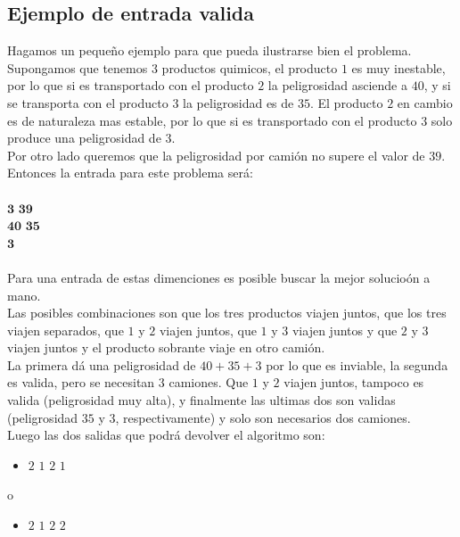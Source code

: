 \subsection{Ejemplo de entrada valida}
Hagamos un pequeño ejemplo para que pueda ilustrarse bien el problema.
\\
Supongamos que tenemos $3$ productos quimicos, el producto $1$ es muy inestable, por lo que si es transportado con el producto $2$ la peligrosidad asciende a $40$, y si se transporta con el producto $3$ la peligrosidad es de $35$. El producto $2$ en cambio es de naturaleza mas estable, por lo que si es transportado con el producto $3$ solo produce una peligrosidad de $3$.
\\
Por otro lado queremos que la peligrosidad por cami\'on no supere el valor de $39$.
\\
Entonces la entrada para este problema ser\'a:
\\
\\
$\textbf{3 39}$
\\
$\textbf{40 35}$
\\
$\textbf{3}$
\\
\\
Para una entrada de estas dimenciones es posible buscar la mejor solucio\'on a mano.
\\
Las posibles combinaciones son que los tres productos viajen juntos, que los tres viajen separados, que $1$ y $2$ viajen juntos, que $1$ y $3$ viajen juntos y que $2$ y $3$ viajen juntos y el producto sobrante viaje en otro cami\'on.
\\
La primera d\'a una peligrosidad de $40+35+3$ por lo que es inviable, la segunda es valida, pero se necesitan $3$ camiones. Que $1$ y $2$ viajen juntos, tampoco es valida (peligrosidad muy alta), y finalmente las ultimas dos son validas (peligrosidad $35$ y $3$, respectivamente) y solo son necesarios dos camiones.
\\
Luego las dos salidas que podr\'a devolver el algoritmo son:
\begin{itemize}
\item $2$ $1$ $2$ $1$
\end{itemize}
o
\begin{itemize}
\item $2$ $1$ $2$ $2$
\end{itemize}
\\
